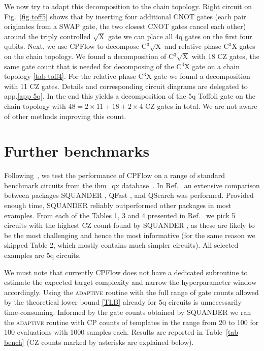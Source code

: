 \documentclass[twocolumn, amsfonts, amssymb, aps, nofootinbib]{revtex4-2}
\newcommand{\CZ}{\textsf{CZ }}
\newcommand{\CX}{\textsf{CNOT }}
\newcommand{\CP}{\textsf{CP }}
\newcommand{\cx}[1]{C${}^{#1}$X}
\newcommand{\package}[1]{\textrm {#1 }}
\newcommand{\cpflow}{\package{CPFlow}}
\newcommand{\adaptive}{\textsc{adaptive }}
\begin{document}
We now try to adapt this decomposition to the chain topology. Right circuit on Fig.~\ref{fig toff5} shows that by inserting four additional \CX gates (each pair originates from a SWAP gate, the two closest \CX gates cancel each other) around the triply controlled $\sqrt{\text{X}}$ gate we can place all 4q gates on the first four qubits. Next, we use \cpflow to decompose C${}^{3}\sqrt{\text{X}}$ and relative phase \cx{3} gates on the chain topology. We found a decomposition of C${}^{3}\sqrt{\text{X}}$ with 18 \CZ gates, the same gate count that is needed for decomposing of the \cx{3} gate on a chain topology \ref{tab toff4}. For the relative phase \cx{3} gate we found a decomposition with 11 \CZ gates. Details and corresponding circuit diagrams are delegated to app.\ref{app 5q}. In the end this yields a decomposition of the 5q Toffoli gate on the chain topology with $48=2\times 11+18+2\times4$ \CZ gates in total. We are not aware of other methods improving this count.

\section{Further benchmarks \label{sec benchmark}}

Following~\cite{Rakyta2022}, we test the performance of \package{CPFlow} on a range of standard benchmark circuits from the ibm\_qx database~\cite{Zulehner2019, ibmqx}. In Ref.~\cite{Rakyta2022} an extensive comparison between packages \package{SQUANDER}, \package{QFast}, and \package{QSearch} was performed. Provided enough time, \package{SQUANDER} reliably outperformed other packages in most examples. From each of the Tables 1, 3 and 4 presented in Ref.~\cite{Rakyta2022} we pick 5 circuits with the highest \CZ count found by \package{SQUANDER}, as these are likely to be the most challenging and hence the most informative (for the same reason we skipped Table 2, which mostly contains much simpler circuits). All selected examples are 5q circuits.

We must note that currently \cpflow does not have a dedicated subroutine to estimate the expected target complexity and narrow the hyperparameter window accordingly. Using the \adaptive routine with the full range of gate counts allowed by the theoretical lower bound \eqref{TLB} already for 5q circuits is unnecessarily time-consuming. Informed by the gate counts obtained by \package{SQUANDER} we ran the \adaptive routine with \CP counts of templates in the range from 20 to 100 for 100 evaluations with 1000 samples each. Results are reported in Table~\ref{tab bench} (\CZ counts marked by asterisks are explained below).
\end{document}
